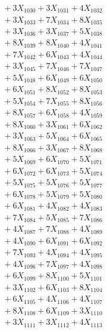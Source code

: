 \documentclass[a4paper,10pt]{article}
\begin{document}
{\begin{align}
&\;  + 3 X_{1030} + 3 X_{1031} + 4 X_{1032} \\[0.3ex]
&\;  + 3 X_{1033} + 7 X_{1034} + 8 X_{1035} \\[0.3ex]
&\;  + 3 X_{1036} + 3 X_{1037} + 5 X_{1038} \\[0.3ex]
&\;  + 8 X_{1039} + 8 X_{1040} + 4 X_{1041} \\[0.3ex]
&\;  + 7 X_{1042} + 6 X_{1043} + 4 X_{1044} \\[0.3ex]
&\;  + 3 X_{1045} + 7 X_{1046} + 7 X_{1047} \\[0.3ex]
&\;  + 5 X_{1048} + 6 X_{1049} + 6 X_{1050} \\[0.3ex]
&\;  + 6 X_{1051} + 8 X_{1052} + 8 X_{1053} \\[0.3ex]
&\;  + 5 X_{1054} + 7 X_{1055} + 8 X_{1056} \\[0.3ex]
&\;  + 8 X_{1057} + 6 X_{1058} + 4 X_{1059} \\[0.5ex]\allowbreak
&\;  + 8 X_{1060} + 3 X_{1061} + 6 X_{1062} \\[0.3ex]
&\;  + 3 X_{1063} + 5 X_{1064} + 6 X_{1065} \\[0.3ex]
&\;  + 8 X_{1066} + 3 X_{1067} + 8 X_{1068} \\[0.3ex]
&\;  + 5 X_{1069} + 6 X_{1070} + 5 X_{1071} \\[0.3ex]
&\;  + 6 X_{1072} + 6 X_{1073} + 5 X_{1074} \\[0.3ex]
&\;  + 5 X_{1075} + 5 X_{1076} + 5 X_{1077} \\[0.3ex]
&\;  + 6 X_{1078} + 5 X_{1079} + 5 X_{1080} \\[0.3ex]
&\;  + 6 X_{1081} + 4 X_{1082} + 4 X_{1083} \\[0.3ex]
&\;  + 7 X_{1084} + 5 X_{1085} + 7 X_{1086} \\[0.3ex]
&\;  + 4 X_{1087} + 7 X_{1088} + 4 X_{1089} \\[0.5ex]\allowbreak
&\;  + 4 X_{1090} + 6 X_{1091} + 6 X_{1092} \\[0.3ex]
&\;  + 7 X_{1093} + 4 X_{1094} + 4 X_{1095} \\[0.3ex]
&\;  + 4 X_{1096} + 7 X_{1097} + 4 X_{1098} \\[0.3ex]
&\;  + 6 X_{1099} + 8 X_{1100} + 5 X_{1101} \\[0.3ex]
&\;  + 3 X_{1102} + 6 X_{1103} + 8 X_{1104} \\[0.3ex]
&\;  + 6 X_{1105} + 4 X_{1106} + 4 X_{1107} \\[0.3ex]
&\;  + 8 X_{1108} + 6 X_{1109} + 3 X_{1110} \\[0.3ex]
&\;  + 3 X_{1111} + 3 X_{1112} + 4 X_{1113} \\[0.3ex]

\end{align}}
\end{document}
